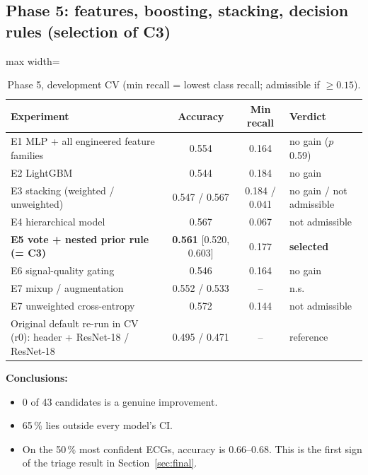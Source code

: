 \subsection{Phase 5: features, boosting, stacking, decision rules (selection of C3)}
\begin{table}[H]\centering\small
\caption{Phase 5, development CV (min recall = lowest class recall; admissible if $\ge0.15$).}\label{tab:p5}
\begin{adjustbox}{max width=\linewidth}
\begin{tabular}{lccl}\toprule
Experiment & Accuracy & Min recall & Verdict \\\midrule
E1 MLP + all engineered feature families & 0.554 & 0.164 & no gain ($p$ 0.59) \\
E2 LightGBM & 0.544 & 0.184 & no gain \\
E3 stacking (weighted / unweighted) & 0.547 / 0.567 & 0.184 / 0.041 & no gain / not admissible \\
E4 hierarchical model & 0.567 & 0.067 & not admissible \\
\textbf{E5 vote + nested prior rule (= C3)} & \textbf{0.561} [0.520, 0.603] & 0.177 & \textbf{selected} \\
E6 signal-quality gating & 0.546 & 0.164 & no gain \\
E7 mixup / augmentation & 0.552 / 0.533 & -- & n.s. \\
E7 unweighted cross-entropy & 0.572 & 0.144 & not admissible \\
Original default re-run in CV (r0): header + ResNet-18 / ResNet-18 & 0.495 / 0.471 & -- & reference \\\bottomrule
\end{tabular}
\end{adjustbox}
\end{table}
\textbf{Conclusions:}
\begin{itemize}
  \item 0 of 43 candidates is a genuine improvement.
  \item 65\,\% lies outside every model's CI.
  \item On the 50\,\% most confident ECGs, accuracy is 0.66--0.68. This is the first sign of the triage result in
    Section~\ref{sec:final}.
\end{itemize}
